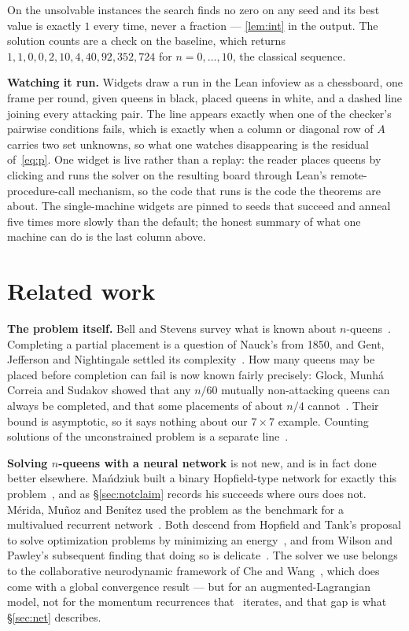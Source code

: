 \documentclass{easychair}
\newcommand{\secref}[1]{\hyperref[#1]{\textcolor{academicpurple}{\S\ref*{#1}}}}
\newcommand{\citeref}[1]{\textcolor{academicpurple}{\cite{#1}}}
\begin{document}
On the unsolvable instances the search finds no zero on any seed and its best value is exactly $1$
every time, never a fraction --- \cref{lem:int} in the output. The solution counts are a check on the
baseline, which returns $1,1,0,0,2,10,4,40,92,352,724$ for $n = 0,\dots,10$, the classical sequence.

\medskip\noindent\textbf{Watching it run.} Widgets draw a run in the Lean infoview as a chessboard,
one frame per round, given queens in black, placed queens in white, and a dashed line joining every
attacking pair. The line appears exactly when one of the checker's pairwise conditions fails, which is
exactly when a column or diagonal row of $A$ carries two set unknowns, so what one watches
disappearing is the residual of~\eqref{eq:p}. One widget is live rather than a replay: the reader
places queens by clicking and runs the solver on the resulting board through Lean's
remote-procedure-call mechanism, so the code that runs is the code the theorems are about. The
single-machine widgets are pinned to seeds that succeed and anneal five times more slowly than the
default; the honest summary of what one machine can do is the last column above.

\section{Related work}\label{sec:related}

\noindent\textbf{The problem itself.} Bell and Stevens survey what is known about
$n$-queens~\citeref{bell2009}. Completing a partial placement is a question of Nauck's from 1850, and
Gent, Jefferson and Nightingale settled its complexity~\citeref{gent2017}. How many queens may be
placed before completion can fail is now known fairly precisely: Glock, Munh\'{a} Correia and Sudakov
showed that any $n/60$ mutually non-attacking queens can always be completed, and that some
placements of about $n/4$ cannot~\citeref{glock2022}. Their bound is asymptotic, so it says nothing
about our $7\times7$ example. Counting solutions of the unconstrained problem is a separate
line~\citeref{simkin2021}.

\medskip\noindent\textbf{Solving $n$-queens with a neural network} is not new, and is in fact done
better elsewhere. Ma\'{n}dziuk built a binary Hopfield-type network for exactly this
problem~\citeref{mandziuk1995}, and as \secref{sec:notclaim} records his succeeds where ours does
not. M\'{e}rida, Mu\~{n}oz and Ben\'{i}tez used the problem as the benchmark for a multivalued recurrent
network~\citeref{merida2001}. Both descend from Hopfield and Tank's proposal to solve optimization
problems by minimizing an energy~\citeref{hopfieldtank1985}, and from Wilson and Pawley's subsequent
finding that doing so is delicate~\citeref{wilson1988}. The solver we use belongs to the collaborative neurodynamic framework of Che and
Wang~\citeref{che2019}, which does come with a global convergence result --- but for an
augmented-Lagrangian model, not for the momentum recurrences that~\citeref{liwang2022} iterates, and
that gap is what \secref{sec:net} describes.
\end{document}
